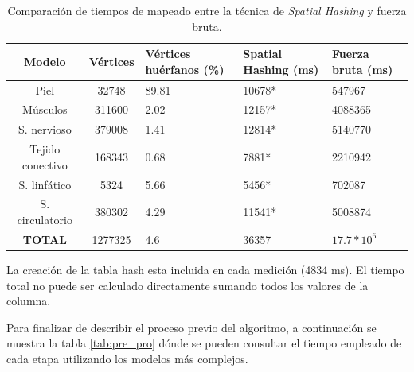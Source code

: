 \begin{table}[h]

\begin{threeparttable}
\centering

\caption{Comparación de tiempos de mapeado entre la técnica de \emph{Spatial Hashing} y fuerza bruta. }
\label{tab:bruteforce}
\begin{tabular}{|c|c|x{25mm}|x{25mm}|x{25mm}|}

\hline
\textbf{Modelo} & \textbf{Vértices} & \textbf{Vértices  huérfanos (\%)}  & \textbf{Spatial Hashing (ms)} & \textbf{Fuerza bruta (ms)} \\ 
\hline
Piel             &32748      &89.81   &10678* &547967\\
\hline
Músculos         &311600     &2.02    &12157* &4088365\\ 
\hline
S. nervioso      &379008     &1.41    &12814* &5140770\\ 
\hline
Tejido conectivo &168343     &0.68    &7881*  &2210942\\ 
\hline
S. linfático     &5324       &5.66    &5456*  &702087\\ 
\hline
S. circulatorio  &380302     &4.29    &11541* &5008874\\ 
\hline
\textbf{TOTAL}   &1277325    &4.6     &36357  &$17.7*10^6$ \\
\hline

\end{tabular}
\begin{tablenotes}
      \small
      \item * La creación de la \ac{tabla hash} esta incluida en cada medición (4834 ms). El tiempo total no puede ser calculado directamente sumando todos los valores de la columna.
    \end{tablenotes}

\end{threeparttable}
\end{table}


Para finalizar de describir el proceso previo del algoritmo, a continuación se muestra la tabla \ref{tab:pre_pro} dónde se pueden consultar el tiempo empleado de cada etapa utilizando los modelos más complejos. 







